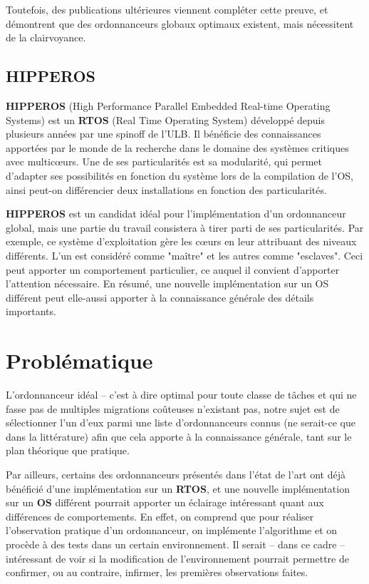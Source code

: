 \documentclass[11pt,a4paper,oneside]{report}
\begin{document}
	Toutefois, des publications ultérieures viennent compléter cette preuve, et démontrent 
	que des ordonnanceurs globaux optimaux existent, mais nécessitent de la clairvoyance.
	
	\subsection{HIPPEROS}
	\textbf{HIPPEROS} (High Performance Parallel Embedded Real-time Operating Systems)
	est un \textbf{RTOS} (Real Time Operating System) développé depuis plusieurs années par une spinoff de l'ULB.
	Il bénéficie des connaissances apportées par le monde de la recherche dans 
	le domaine des systèmes critiques avec multic\oe{}urs. Une de ses particularités 
	est sa modularité, qui permet d'adapter ses possibilités en fonction du système 
	lors de la compilation de l'OS, ainsi peut-on différencier deux installations 
	en fonction des particularités.
	
	\textbf{HIPPEROS} est un candidat idéal pour l'implémentation d'un ordonnanceur 
	global, mais une partie du travail consistera à tirer parti de ses particularités. 
	Par exemple, ce système d'exploitation gère les c\oe{}urs en leur attribuant des 
	niveaux différents. L'un est considéré comme "maître" et les autres comme "esclaves". 
	Ceci peut apporter un comportement particulier, ce auquel il convient d'apporter 
	l'attention nécessaire. En résumé, une nouvelle implémentation sur un OS différent 
	peut elle-aussi apporter à la connaissance générale des détails importants.
	
	
	\section{Problématique}
	L'ordonnanceur idéal -- c'est à dire optimal pour toute classe de tâches et 
	qui ne fasse pas de multiples migrations coûteuses n'existant pas, 
	notre sujet est de sélectionner l'un d'eux parmi une liste 
	d'ordonnanceurs connus (ne serait-ce que dans la littérature) afin que cela apporte 
	à la connaissance générale, tant sur le plan théorique que pratique.\medskip
	
	Par ailleurs, certains des ordonnanceurs présentés dans l'état de l'art 
	ont déjà bénéficié d'une implémentation sur un \textbf{RTOS}, et une nouvelle 
	implémentation sur un \textbf{OS} différent pourrait apporter un éclairage intéressant quant 
	aux différences de comportements.
	En effet, on comprend que pour réaliser l'observation pratique d'un ordonnanceur, 
	on implémente l'algorithme et on procède à des tests dans un certain environnement. 
	Il serait -- dans ce cadre -- intéressant de voir si la modification de l'environnement 
	pourrait permettre de confirmer, ou au contraire, infirmer, les premières observations faites.
	
\end{document}
